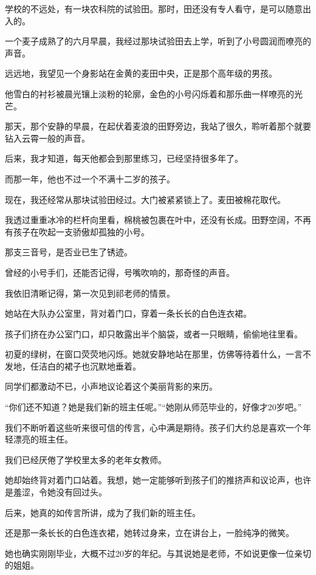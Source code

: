 		学校的不远处，有一块农科院的试验田。那时，田还没有专人看守，是可以随意出入的。\par
		一个麦子成熟了的六月早晨，我经过那块试验田去上学，听到了小号圆润而嘹亮的声音。\par
		远远地，我望见一个身影站在金黄的麦田中央，正是那个高年级的男孩。\par
		他雪白的衬衫被晨光镶上淡粉的轮廓，金色的小号闪烁着和那乐曲一样嘹亮的光芒。

		那天，那个安静的早晨，在起伏着麦浪的田野旁边，我站了很久，聆听着那个就要钻入云霄一般的声音。

		后来，我才知道，每天他都会到那里练习，已经坚持很多年了。\par
		而那一年，他也不过一个不满十二岁的孩子。

		现在，我还经常从那块试验田经过。大门被紧紧锁上了。麦田被棉花取代。\par
		我透过重重冰冷的栏杆向里看，棉桃被包裹在叶中，还没有长成。田野空阔，不再有孩子在吹起一支骄傲却孤独的小号。

		那支三音号，是否业已生了锈迹。\par
		曾经的小号手们，还能否记得，号嘴吹响的，那奇怪的声音。


		我依旧清晰记得，第一次见到祁老师的情景。

		她站在大队办公室里，背对着门口，穿着一条长长的白色连衣裙。

		孩子们挤在办公室门口，却只敢露出半个脑袋，或者一只眼睛，偷偷地往里看。\par
		初夏的绿树，在窗口荧荧地闪烁。她就安静地站在那里，仿佛等待着什么，一言不发地，任洁白的裙子也沉默地垂着。

		同学们都激动不已，小声地议论着这个美丽背影的来历。\par
		“你们还不知道？她是我们新的班主任呢。”“她刚从师范毕业的，好像才20岁吧。”\par
		我们不断听着这些听来很可信的传言，心中满是期待。孩子们大约总是喜欢一个年轻漂亮的班主任。\par
		我们已经厌倦了学校里太多的老年女教师。

		她却始终背对着门口站着。我想，她一定能够听到孩子们的推挤声和议论声，也许是羞涩，令她没有回过头。\par
		后来，她真的如传言所讲，成为了我们新的班主任。\par
		还是那一条长长的白色连衣裙，她转过身来，立在讲台上，一脸纯净的微笑。\par
		她也确实刚刚毕业，大概不过20岁的年纪。与其说她是老师，不如说更像一位亲切的姐姐。

